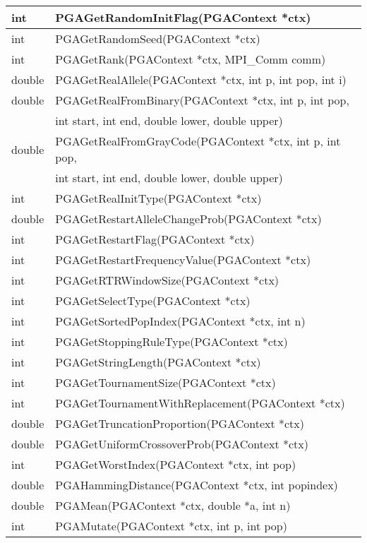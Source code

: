 \documentclass{report}
\begin{document}
\begin{tabular}{|l|l|}
int &  PGAGetRandomInitFlag(PGAContext *ctx) \\ \hline
int &  PGAGetRandomSeed(PGAContext *ctx) \\ \hline
int &  PGAGetRank(PGAContext *ctx, MPI\_Comm comm) \\ \hline
double &  PGAGetRealAllele(PGAContext *ctx, int p, int pop, int i) \\ \hline
double &  PGAGetRealFromBinary(PGAContext *ctx, int p, int pop, \\
       &  int start, int end, double lower, double upper) \\ \hline
double &  PGAGetRealFromGrayCode(PGAContext *ctx, int p, int pop, \\
       &  int start, int end, double lower, double upper) \\ \hline
int &  PGAGetRealInitType(PGAContext *ctx) \\ \hline
double &  PGAGetRestartAlleleChangeProb(PGAContext *ctx) \\ \hline
int &  PGAGetRestartFlag(PGAContext *ctx) \\ \hline
int &  PGAGetRestartFrequencyValue(PGAContext *ctx) \\ \hline
int &  PGAGetRTRWindowSize(PGAContext *ctx) \\ \hline
int &  PGAGetSelectType(PGAContext *ctx) \\ \hline
int &  PGAGetSortedPopIndex(PGAContext *ctx, int n) \\ \hline
int &  PGAGetStoppingRuleType(PGAContext *ctx) \\ \hline
int &  PGAGetStringLength(PGAContext *ctx) \\ \hline
int &  PGAGetTournamentSize(PGAContext *ctx) \\ \hline
int &  PGAGetTournamentWithReplacement(PGAContext *ctx) \\ \hline
double &  PGAGetTruncationProportion(PGAContext *ctx) \\ \hline
double &  PGAGetUniformCrossoverProb(PGAContext *ctx) \\ \hline
int &  PGAGetWorstIndex(PGAContext *ctx, int pop) \\ \hline
double &  PGAHammingDistance(PGAContext *ctx, int popindex) \\ \hline
double &  PGAMean(PGAContext *ctx, double *a, int n) \\ \hline
int &  PGAMutate(PGAContext *ctx, int p, int pop) \\ \hline
\end{tabular}
\end{document}
